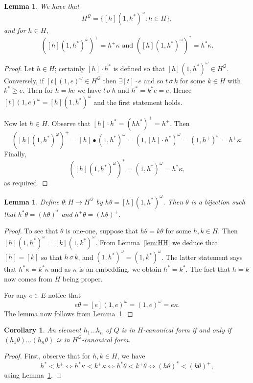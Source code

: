 \documentclass[12pt]{amsart}
\newtheorem{lem}[them]{Lemma}
\newtheorem{cor}[them]{Corollary}
\theoremstyle{definition}
\theoremstyle{definition}
\numberwithin{them}{section}
\numberwithin{equation}{section}
\begin{document}
{{\begin{lem}\label{lem:htrick} We have that
\[H^{\mathcal{Q}}=\{ [h](1,h^*)^\omega:h\in H\},\]
and for $h\in H,$ 
\[([h](1,h^*)^\omega)^+=h^+\kappa\mbox{ and }
([h](1,h^*)^\omega)^*=h^*\kappa.\]
\end{lem}
\begin{proof} Let $h\in H$; certainly $[h]\cdot h^*$ is defined so that $[h](1,h^*)^\omega\in H^{\mathcal{Q}}$.
Conversely, if $[t](1,e)^\omega\in H^{\mathcal{Q}}$ then
$\exists [t]\cdot e$ and so $t\,\sigma\, k$ for some $k\in H$ with $k^*\geq e$. Then for 
$h=ke$ we have  $t\,\sigma\, h$  and  $h^*=k^*e=e$. Hence $[t](1,e)^\omega=
[h](1,h^*)^\omega$ and the first statement holds. 

Now let  $h\in H$. Observe that $[h]\cdot h^*=(hh^*)^+=h^+$. Then
\[([h](1,h^*)^\omega)^+=[h]\bullet (1,h^*)^\omega=
(1,[h]\cdot h^*)^\omega=(1,h^+)^\omega=h^+\kappa.\]
Finally, 
\[([h](1,h^*)^\omega)^*=(1,h^*)^\omega=h^*\kappa,\]  
as required.
\end{proof}


\begin{lem}\label{lem:theta} Define $\theta:H\rightarrow H^{\mathcal{Q}}$ by  $h\theta=[h](1,h^*)^\omega$.
Then $\theta$ is a bijection such that 
$h^*\theta=(h\theta)^*$ and $h^+\theta=(h\theta)^+$.
\end{lem}
\begin{proof} To see that $\theta$ is one-one, suppose that
$h\theta=k\theta$ for some $h,k\in H$. Then
$[h](1,h^*)^\omega=[k](1,k^*)^\omega$. From Lemma~\ref{lem:HH} we deduce that $[h]=[k]$ so that $h\,\sigma\, k$, and $(1,h^*)^\omega=(1,k^*)^\omega$. The latter statement says that $h^*\kappa=k^*\kappa$ and as $\kappa$ is an embedding, we  obtain $h^*=k^*$. The fact that $h=k$ now comes from $H$ being proper. 

For any $e\in E$ notice that 
\[e\theta=[e](1,e)^\omega=(1,e)^\omega=e\kappa.\]
The lemma now follows from Lemma~\ref{lem:htrick}.\end{proof}


\begin{cor}\label{cor:nf} An element $h_1\dots h_n$ of $Q$ is in $H$-canonical form if and only if 
$(h_1\theta)\dots (h_n\theta)$ is in $H^{\mathcal{Q}}$-canonical form.
\end{cor}
\begin{proof} First, observe that for $h,k\in H$, we have 
\[h^*<k^+\Leftrightarrow h^*\kappa<k^+\kappa\Leftrightarrow h^*\theta<k^+\theta\Leftrightarrow (h\theta)^*<(k\theta)^+,\]
 using Lemma~\ref{lem:theta}. 


\end{proof}}}
\end{document}
